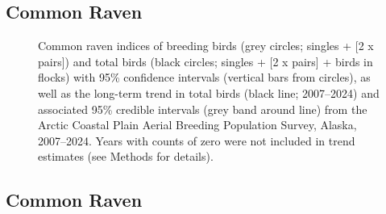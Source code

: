 \documentclass[
]{article}
\begin{document}
\newpage{}

\subsection*{Common Raven}\label{common-raven}

\begin{figure}


\caption{\label{fig-CORA}Common raven indices of breeding birds (grey
circles; singles + {[}2 x pairs{]}) and total birds (black circles;
singles + {[}2 x pairs{]} + birds in flocks) with 95\% confidence
intervals (vertical bars from circles), as well as the long-term trend
in total birds (black line; 2007--2024) and associated 95\% credible
intervals (grey band around line) from the Arctic Coastal Plain Aerial
Breeding Population Survey, Alaska, 2007--2024. Years with counts of
zero were not included in trend estimates (see Methods for details).}

\end{figure}%

\newpage{}

\subsection*{Common Raven}\label{common-raven-1}

\begingroup\fontsize{10}{12}\selectfont
\end{document}
